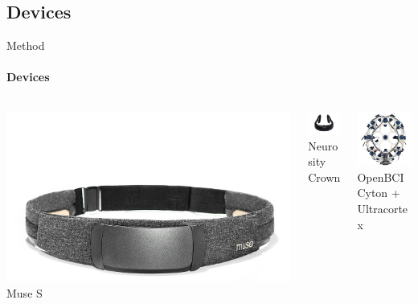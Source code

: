 \documentclass[xcolor={dvipsnames,table}]{beamer}
\begin{document}
    \subsection{Devices}
\begin{frame}{Method}
    \framesubtitle{Devices}

    \begin{columns}
        \begin{column}{0.33\textwidth}
            \centering
            \includegraphics[trim=0 0 0 200,clip,width=\textwidth]{./img/Muse-S.jpg}
            \\ Muse S
        \end{column}

        \begin{column}{0.33\textwidth}
            \centering
            \includegraphics[trim=200 100 200 100,clip,width=3cm]{./img/crown-1.png}
            \\ Neurosity Crown
            \vspace{8mm}
        \end{column}

        \begin{column}{0.33\textwidth}
            \centering
            \includegraphics[width=3cm]{./img/openbci-cyton.jpg}
            \\ OpenBCI Cyton + Ultracortex
            \vspace{11mm}
        \end{column}
    \end{columns}

    {
        \tiny
        
    }
\end{frame}
\end{document}

